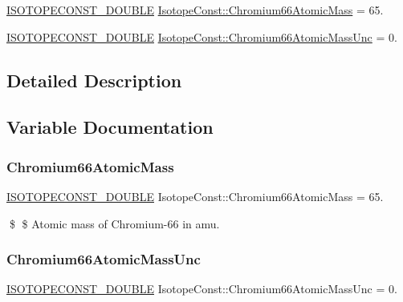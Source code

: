 \begin{DoxyCompactItemize}
\item 
\mbox{\hyperlink{group___isotope_const-_macros_ga8f45a7272ce02c0b4c65c44636ed719a}{I\+S\+O\+T\+O\+P\+E\+C\+O\+N\+S\+T\+\_\+\+D\+O\+U\+B\+LE}} \mbox{\hyperlink{group___isotope_const-_chromium-_cr66_ga213a75b076c90db2d7e849ec819ddfe0}{Isotope\+Const\+::\+Chromium66\+Atomic\+Mass}} = 65.
\item 
\mbox{\hyperlink{group___isotope_const-_macros_ga8f45a7272ce02c0b4c65c44636ed719a}{I\+S\+O\+T\+O\+P\+E\+C\+O\+N\+S\+T\+\_\+\+D\+O\+U\+B\+LE}} \mbox{\hyperlink{group___isotope_const-_chromium-_cr66_ga54655cad6ce1e5a0645827ba0d358228}{Isotope\+Const\+::\+Chromium66\+Atomic\+Mass\+Unc}} = 0.
\end{DoxyCompactItemize}


\subsection{Detailed Description}


\subsection{Variable Documentation}
\mbox{\label{group___isotope_const-_chromium-_cr66_ga213a75b076c90db2d7e849ec819ddfe0}} 
\subsubsection{\texorpdfstring{Chromium66\+Atomic\+Mass}{Chromium66AtomicMass}}
{\footnotesize\ttfamily \mbox{\hyperlink{group___isotope_const-_macros_ga8f45a7272ce02c0b4c65c44636ed719a}{I\+S\+O\+T\+O\+P\+E\+C\+O\+N\+S\+T\+\_\+\+D\+O\+U\+B\+LE}} Isotope\+Const\+::\+Chromium66\+Atomic\+Mass = 65.}

\$ \$ Atomic mass of Chromium-\/66 in amu. \mbox{\label{group___isotope_const-_chromium-_cr66_ga54655cad6ce1e5a0645827ba0d358228}} 
\subsubsection{\texorpdfstring{Chromium66\+Atomic\+Mass\+Unc}{Chromium66AtomicMassUnc}}
{\footnotesize\ttfamily \mbox{\hyperlink{group___isotope_const-_macros_ga8f45a7272ce02c0b4c65c44636ed719a}{I\+S\+O\+T\+O\+P\+E\+C\+O\+N\+S\+T\+\_\+\+D\+O\+U\+B\+LE}} Isotope\+Const\+::\+Chromium66\+Atomic\+Mass\+Unc = 0.}


